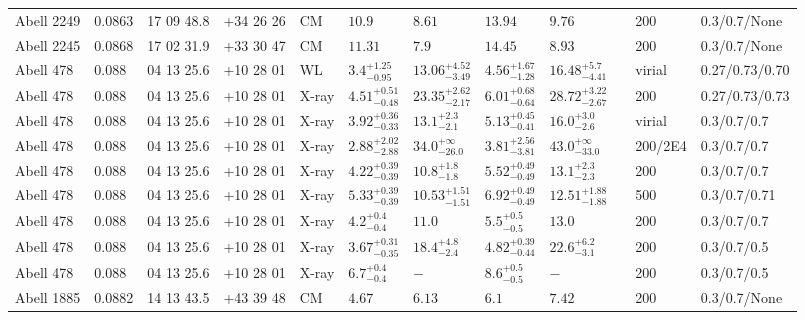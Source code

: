 \begin{landscape}
\begin{center}
{\begin{longtable}{llllllllllll}
Abell 2249 & 0.0863 & 17 09 48.8 & +34 26 26 & CM & ${10.9}^{}_{}$ & ${8.61}^{}_{}$ & ${13.94}^{}_{}$ & ${9.76}^{}_{}$ & \citet{RI06.1} & 200 & 0.3/0.7/None \\
Abell 2245 & 0.0868 & 17 02 31.9 & +33 30 47 & CM & ${11.31}^{}_{}$ & ${7.9}^{}_{}$ & ${14.45}^{}_{}$ & ${8.93}^{}_{}$ & \citet{RI06.1} & 200 & 0.3/0.7/None \\
Abell 478 & 0.088 & 04 13 25.6 & +10 28 01 & WL & ${3.4}^{+1.25}_{-0.95}$ & ${13.06}^{+4.52}_{-3.49}$ & ${4.56}^{+1.67}_{-1.28}$ & ${16.48}^{+5.7}_{-4.41}$ & \citet{OK15.1} & virial & 0.27/0.73/0.70 \\
Abell 478 & 0.088 & 04 13 25.6 & +10 28 01 & X-ray & ${4.51}^{+0.51}_{-0.48}$ & ${23.35}^{+2.62}_{-2.17}$ & ${6.01}^{+0.68}_{-0.64}$ & ${28.72}^{+3.22}_{-2.67}$ & \citet{BA14.1} & 200 & 0.27/0.73/0.73 \\
Abell 478 & 0.088 & 04 13 25.6 & +10 28 01 & X-ray & ${3.92}^{+0.36}_{-0.33}$ & ${13.1}^{+2.3}_{-2.1}$ & ${5.13}^{+0.45}_{-0.41}$ & ${16.0}^{+3.0}_{-2.6}$ & \citet{SC07.1} & virial & 0.3/0.7/0.7 \\
Abell 478 & 0.088 & 04 13 25.6 & +10 28 01 & X-ray & ${2.88}^{+2.02}_{-2.88}$ & ${34.0}^{+\infty}_{-26.0}$ & ${3.81}^{+2.56}_{-3.81}$ & ${43.0}^{+\infty}_{-33.0}$ & \citet{VO06.1} & 200/2E4 & 0.3/0.7/0.7 \\
Abell 478 & 0.088 & 04 13 25.6 & +10 28 01 & X-ray & ${4.22}^{+0.39}_{-0.39}$ & ${10.8}^{+1.8}_{-1.8}$ & ${5.52}^{+0.49}_{-0.49}$ & ${13.1}^{+2.3}_{-2.3}$ & \citet{PO05.1} & 200 & 0.3/0.7/0.7 \\
Abell 478 & 0.088 & 04 13 25.6 & +10 28 01 & X-ray & ${5.33}^{+0.39}_{-0.39}$ & ${10.53}^{+1.51}_{-1.51}$ & ${6.92}^{+0.49}_{-0.49}$ & ${12.51}^{+1.88}_{-1.88}$ & \citet{VI06.1} & 500 & 0.3/0.7/0.71 \\
Abell 478 & 0.088 & 04 13 25.6 & +10 28 01 & X-ray & ${4.2}^{+0.4}_{-0.4}$ & ${11.0}^{}_{}$ & ${5.5}^{+0.5}_{-0.5}$ & ${13.0}^{}_{}$ & \citet{PO04.1} & 200 & 0.3/0.7/0.7 \\
Abell 478 & 0.088 & 04 13 25.6 & +10 28 01 & X-ray & ${3.67}^{+0.31}_{-0.35}$ & ${18.4}^{+4.8}_{-2.4}$ & ${4.82}^{+0.39}_{-0.44}$ & ${22.6}^{+6.2}_{-3.1}$ & \citet{AL03.1} & 200 & 0.3/0.7/0.5 \\
Abell 478 & 0.088 & 04 13 25.6 & +10 28 01 & X-ray & ${6.7}^{+0.4}_{-0.4}$ & ${-}^{}_{}$ & ${8.6}^{+0.5}_{-0.5}$ & ${-}^{}_{}$ & \citet{XU01.1} & 200 & 0.3/0.7/0.5 \\
Abell 1885 & 0.0882 & 14 13 43.5 & +43 39 48 & CM & ${4.67}^{}_{}$ & ${6.13}^{}_{}$ & ${6.1}^{}_{}$ & ${7.42}^{}_{}$ & \citet{RI06.1} & 200 & 0.3/0.7/None \\

\end{longtable}}
\end{center}
\end{landscape}
